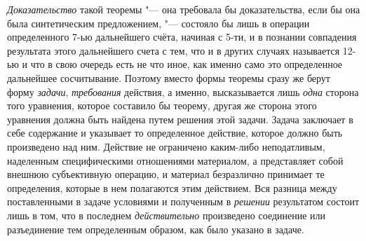 {{{\em Доказательство} такой
теоремы "--- она требовала бы доказательства, если бы она была
синтетическим предложением, "--- состояло бы лишь в операции
определенного 7-ью дальнейшего счёта, начиная с 5-ти, и в познании
совпадения результата этого дальнейшего счета с тем, что и в других случаях
называется 12-ью и что в свою очередь есть не что иное, как именно само это
определенное дальнейшее сосчитывание. Поэтому вместо формы теоремы сразу же
берут форму {\em задачи},
{\em требования} действия,
а именно, высказывается лишь {\em одна}
сторона того уравнения, которое составило бы теорему, другая
же сторона этого уравнения должна быть найдена путем решения этой задачи.
Задача заключает в себе содержание и указывает то определенное действие,
которое должно быть произведено над ним. Действие не ограничено каким-либо
неподатливым, наделенным специфическими отношениями материалом, а
представляет собой внешнюю субъективную операцию, и материал безразлично
принимает те определения, которые в нем полагаются этим действием. Вся
разница между поставленными в задаче условиями и полученным в
{\em решении} результатом
состоит лишь в том, что в последнем
{\em действительно}
произведено соединение или разъединение тем определенным
образом, как было указано в задаче.

}}
